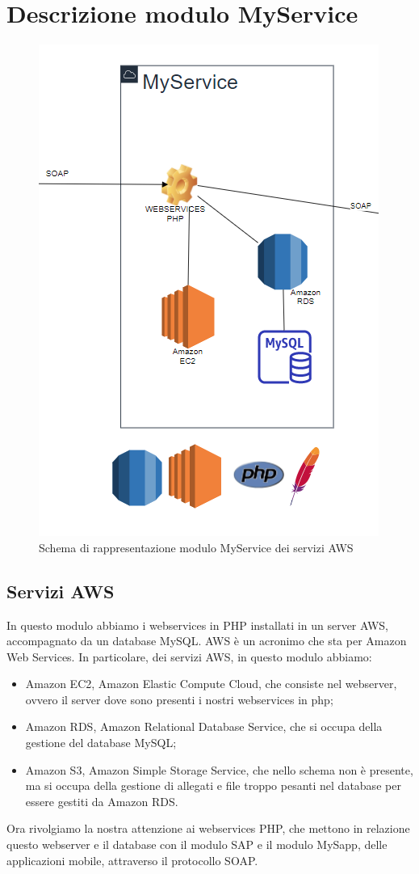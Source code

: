 \section{Descrizione modulo MyService}
\begin{figure}[!h] 
	\centering 
	\includegraphics[scale = 1.1]{immagini/modulo-myservice.png} 
	\caption{Schema di rappresentazione modulo MyService dei servizi AWS}
\end{figure}
\newpage
\subsection{Servizi AWS}
In questo modulo abbiamo i webservices in PHP installati in un server AWS, accompagnato da un database MySQL.
AWS è un acronimo che sta per Amazon Web Services.
In particolare, dei servizi AWS, in questo modulo abbiamo:
\begin{itemize}
	\item Amazon EC2, Amazon Elastic Compute Cloud, che consiste nel webserver, ovvero il server dove sono presenti i nostri webservices in php;
	\item Amazon RDS, Amazon Relational Database Service, che si occupa della gestione del database MySQL;
	\item Amazon S3, Amazon Simple Storage Service, che nello schema non è presente, ma si occupa della gestione di allegati e file troppo pesanti nel database per essere gestiti da Amazon RDS.
\end{itemize}
Ora rivolgiamo la nostra attenzione ai webservices PHP, che mettono in relazione questo webserver e il database con il modulo SAP e il modulo MySapp, delle applicazioni mobile, attraverso il protocollo SOAP.
